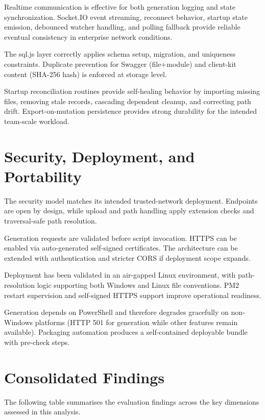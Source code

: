 Realtime communication is effective for both generation logging and state synchronization. Socket.IO event streaming, reconnect behavior, startup state emission, debounced watcher handling, and polling fallback provide reliable eventual consistency in enterprise network conditions.

The sql.js layer correctly applies schema setup, migration, and uniqueness constraints. Duplicate prevention for Swagger (file+module) and client-kit content (SHA-256 hash) is enforced at storage level.

Startup reconciliation routines provide self-healing behavior by importing missing files, removing stale records, cascading dependent cleanup, and correcting path drift. Export-on-mutation persistence provides strong durability for the intended team-scale workload.

\section{Security, Deployment, and Portability}

The security model matches its intended trusted-network deployment. Endpoints are open by design, while upload and path handling apply extension checks and traversal-safe path resolution.

Generation requests are validated before script invocation. HTTPS can be enabled via auto-generated self-signed certificates. The architecture can be extended with authentication and stricter CORS if deployment scope expands.

Deployment has been validated in an air-gapped Linux environment, with path-resolution logic supporting both Windows and Linux file conventions. PM2 restart supervision and self-signed HTTPS support improve operational readiness.

Generation depends on PowerShell and therefore degrades gracefully on non-Windows platforms (HTTP 501 for generation while other features remain available). Packaging automation produces a self-contained deployable bundle with pre-check steps.

\section{Consolidated Findings}

The following table summarises the evaluation findings across the key dimensions assessed in this analysis.

